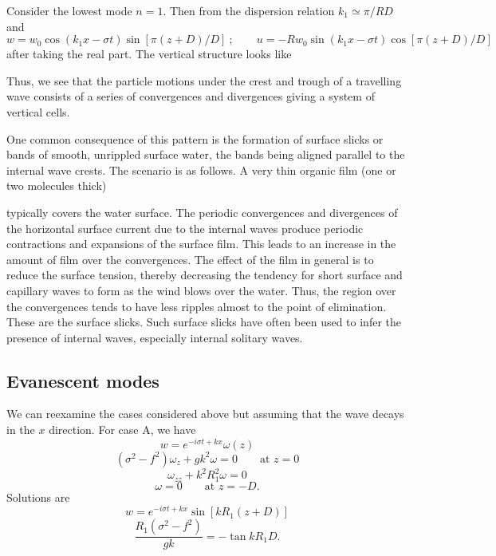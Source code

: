 \sourcepagebreak

Consider the lowest mode $n=1$. Then from the dispersion relation $k_1\simeq\pi/RD$ and
\[
	w=w_0\cos(k_1x-\sigma t)\sin[\pi(z+D)/D]\ ;\qquad
	u=-Rw_0\sin(k_1x-\sigma t)\cos[\pi(z+D)/D]
\]
after taking the real part. The vertical structure looks like


Thus, we see that the particle motions under the crest and trough of a travelling wave
consists of a series of convergences and divergences giving a system of vertical cells.


One common consequence of this pattern is the formation of surface slicks or bands of
smooth, unrippled surface water, the bands being aligned parallel to the internal wave
crests. The scenario is as follows. A very thin organic film (one or two molecules thick)

\sourcepagebreak

typically covers the water surface. The periodic convergences and divergences of the
horizontal surface current due to the internal waves produce periodic contractions and
expansions of the surface film. This leads to an increase in the amount of film over the
convergences. The effect of the film in general is to reduce the surface tension, thereby
decreasing the tendency for short surface and capillary waves to form as the wind blows
over the water. Thus, the region over the convergences tends to have less ripples almost
to the point of elimination. These are the surface slicks. Such surface slicks have often
been used to infer the presence of internal waves, especially internal solitary waves.

\subsection{Evanescent modes}

We can reexamine the cases considered above but assuming that the wave decays in
the $x$ direction. For case A, we have
\[
	w=e^{-i\sigma t+kx}\omega(z)
\]
\[
	(\sigma^2-f^2)\omega_z+gk^2\omega=0\qquad\text{at }z=0
\]
\[
	\omega_{zz}+k^2R_1^2\omega=0
\]
\[
	\omega=0\qquad\text{at }z=-D.
\]
Solutions are
\[
	w=e^{-i\sigma t+kx}\sin[kR_1(z+D)]
\]
\[
	\frac{R_1(\sigma^2-f^2)}{gk}=-\tan kR_1D.
\]

